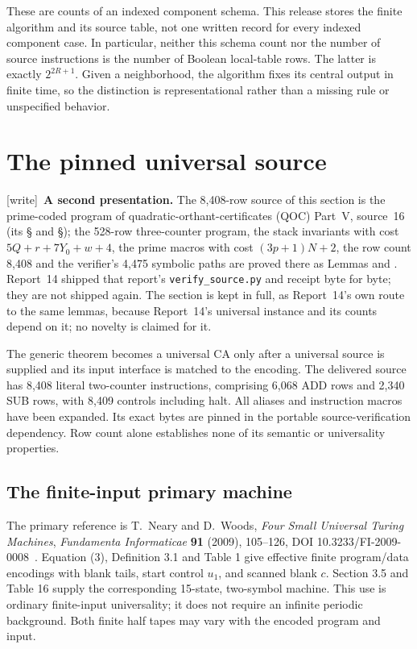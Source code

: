 \documentclass[11pt,a4paper]{article}
\numberwithin{equation}{section}
\newcommand{\wtag}{\textup{[write]}}
\begin{document}
These are counts of an indexed component schema. This release stores the
finite algorithm and its source table, not one written record for every
indexed component case. In particular, neither this schema count nor the
number of source instructions is the number of Boolean local-table rows.
The latter is exactly $2^{2R+1}$. Given a neighborhood, the algorithm fixes its
central output in finite time, so the distinction is representational rather
than a missing rule or unspecified behavior.

\section{The pinned universal source}\label{fpa:bc:sec:universal}
\wtag\ \textbf{A second presentation.} The 8,408-row source of this section is the prime-coded program of quadratic-orthant-certificates (QOC) Part~V, source~16 (its \S{} and \S{}); the 528-row three-counter program, the stack invariants with cost $5Q+r+7Y_0+w+4$, the prime macros with cost $(3p+1)N+2$, the row count 8,408 and the verifier's 4,475 symbolic paths are proved there as Lemmas  and . Report~14 shipped that report's \texttt{verify\_source.py} and receipt byte for byte; they are not shipped again. The section is kept in full, as Report~14's own route to the same lemmas, because Report~14's universal instance and its counts depend on it; no novelty is claimed for it.

The generic theorem becomes a universal CA only after a universal source is
supplied and its input interface is matched to the encoding. The delivered
source has 8,408 literal two-counter instructions, comprising 6,068 ADD rows
and 2,340 SUB rows, with 8,409 controls including halt. All aliases and
instruction macros have been expanded. Its exact bytes are pinned in the
portable source-verification dependency. Row count alone establishes none
of its semantic or universality properties.

\subsection{The finite-input primary machine}
The primary reference is T.~Neary and D.~Woods,
\emph{Four Small Universal Turing Machines}, \emph{Fundamenta Informaticae}
\textbf{91} (2009), 105--126, DOI 10.3233/FI-2009-0008~\cite{fpa:nw}.
Equation (3), Definition 3.1 and Table 1 give effective finite program/data
encodings with blank tails, start control $u_1$, and scanned blank $c$.
Section 3.5 and Table 16 supply the corresponding 15-state, two-symbol
machine. This use is ordinary finite-input universality; it does not require
an infinite periodic background. Both finite half tapes may vary with the
encoded program and input.
\end{document}
